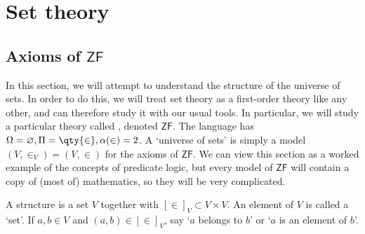 \section{Set theory}

\subsection{Axioms of \texorpdfstring{$\mathsf{ZF}$}{ZF}}
In this section, we will attempt to understand the structure of the universe of sets.
In order to do this, we will treat set theory as a first-order theory like any other, and can therefore study it with our usual tools.
In particular, we will study a particular theory called , denoted $\mathsf{ZF}$.
The language has $\Omega = \varnothing, \Pi = \qty{\in}, \alpha(\in) = 2$.
A `universe of sets' is simply a model $(V, \in_V) = (V, \in)$ for the axioms of $\mathsf{ZF}$.
We can view this section as a worked example of the concepts of predicate logic, but every model of $\mathsf{ZF}$ will contain a copy of (most of) mathematics, so they will be very complicated.

A structure is a set $V$ together with $[\in]_V \subset V \times V$.
An element of $V$ is called a `set'.
If $a, b \in V$ and $(a, b) \in [\in]_V$, say `$a$ belongs to $b$' or `$a$ is an element of $b$'.

